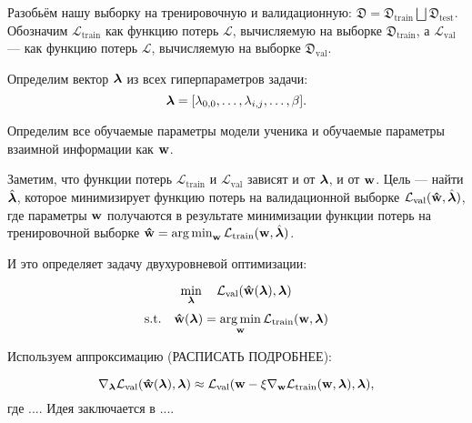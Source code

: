 Разобьём нашу выборку на тренировочную и валидационную: $\mathfrak{D} = \mathfrak{D}_\text{train} \bigsqcup \mathfrak{D}_\text{test}.$
Обозначим $\mathcal{L}_\text{train}$ как функцию потерь $\mathcal{L}$, вычисляемую на выборке $\mathfrak{D}_\text{train}$, а $\mathcal{L}_\text{val}$ ---
как  функцию потерь $\mathcal{L}$, вычисляемую на выборке $\mathfrak{D}_\text{val}$.

Определим вектор $\boldsymbol{\lambda}$ из всех гиперпараметров задачи:
$$\boldsymbol{\lambda} = [\lambda_{0, 0}, \ldots, \lambda_{i, j}, \ldots, \beta].$$

Определим все обучаемые параметры модели ученика и обучаемые параметры взаимной информации как $\bold{w}$.

Заметим, что функции потерь $\mathcal{L}_\text{train}$ и $\mathcal{L}_\text{val}$ зависят и от $\boldsymbol{\lambda}$, и от $\bold{w}$.
Цель --- найти $\hat{\boldsymbol{\lambda}}$, которое минимизирует функцию потерь на валидационной выборке $\mathcal{L}_\text{val}(\bold{\hat{w}}, \hat{\boldsymbol{\lambda}})$, где параметры $\bold{w}$
получаются в результате минимизации функции потерь на тренировочной выборке $\bold{\hat{w}} = \operatorname*{arg\,min}_{\bold{w}}{\mathcal{L}_\text{train}(\bold{w}, \hat{\boldsymbol{\lambda}})}$.

И это определяет задачу двухуровневой оптимизации:

$$\min_{\boldsymbol{\lambda}} \quad \mathcal{L}_\text{val}(\bold{\hat{w}}(\boldsymbol{\lambda}), \boldsymbol{\lambda})$$
$$\text{s.t.} \quad  \bold{\hat{w}}(\boldsymbol{\lambda}) = \operatorname*{arg\,min}_{\bold{w}}{\mathcal{L}_\text{train}(\bold{w}, \boldsymbol{\lambda})} $$

Используем аппроксимацию (РАСПИСАТЬ ПОДРОБНЕЕ):

$$\nabla_{\boldsymbol{\lambda}}  \mathcal{L}_\text{val}(\bold{\hat{w}}(\boldsymbol{\lambda}), \boldsymbol{\lambda}) \approx \mathcal{L}_\text{val}(\bold{w} - \xi \nabla_{\bold{w}}\mathcal{L}_\text{train}(\bold{w}, \boldsymbol{\lambda}), \boldsymbol{\lambda}),$$
где .... Идея заключается в ....
